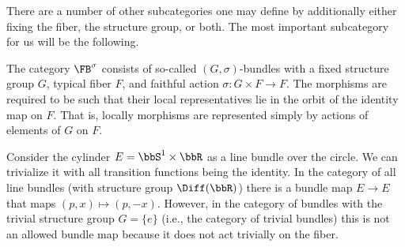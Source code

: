There are a number of other subcategories one may define by additionally either fixing the fiber, the structure group, or both. The most important subcategory for us will be the following.

\begin{defn}\label{def FB^sigma}
    The category $\FB^\sigma$ consists of so-called $(G,\sigma)$-bundles with a fixed structure group $G$, typical fiber $F$, and faithful action $\sigma:G\times F\to F$. The morphisms are required to be such that their local representatives lie in the orbit of the identity map on $F$. That is, locally morphisms are represented simply by actions of elements of $G$ on $F$.
\end{defn}


\begin{example}
    Consider the cylinder $E=\bbS^1\times\bbR $ as a line bundle over the circle. We can trivialize it with all transition functions being the identity. In the category of all line bundles (with structure group $\Diff(\bbR )$) there is a bundle map $E\to E$ that maps $(p,x)\mapsto (p,-x)$. However, in the category of bundles with the trivial structure group $G=\{e\}$ (i.e., the category of trivial bundles) this is not an allowed bundle map because it does not act trivially on the fiber.
\end{example}


